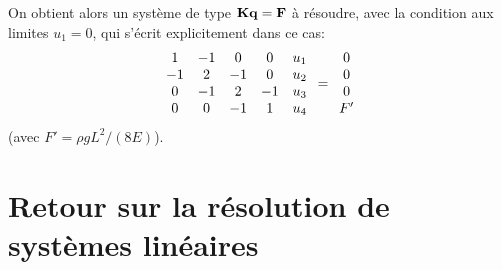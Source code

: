 %
On obtient alors un système de type $\mathbf{K}\mathbf{q}=\mathbf{F}$ à résoudre, avec la condition aux limites $u_1=0$, qui s'écrit explicitement dans ce cas:
\begin{equation}
\mathbf{\begin{array}{cccc} 1 & -1 & 0 & 0 \\ -1 & 2 & -1 & 0 \\ 0 & -1 & 2 & -1\\ 0&0&-1&1
\end{array}}
\mathbf{\begin{array}{c} u_1\\u_2\\u_3\\u_4 \end{array}}
=
\mathbf{\begin{array}{c} 0\\0\\0\\F' \end{array}}
\end{equation}
(avec $F'=\rho g L^2/(8E)$).

\medskipvm
\ifVersionAvecExemplesSepares
   \section{Retour sur la résolution de systèmes linéaires}
\else
